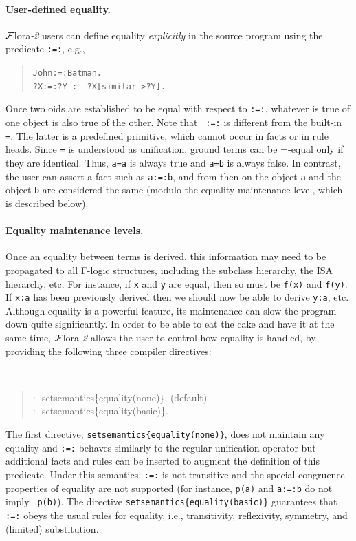 \documentclass[11pt]{article}
\newcommand{\FLORA}{{\mbox{\sc ${\cal F}${lora}\rm\emph{-2}}}\xspace}
\newcommand{\fl}{\mbox{F-logic}\xspace}
\begin{document}
\paragraph{User-defined equality.}
\FLORA users can define equality \emph{explicitly} in the source
program using the predicate {\tt :=:}, e.g.,
\begin{quote}
{\tt John:=:Batman.} \\
{\tt ?X:=:?Y :- ?X[similar->?Y].} \\
\end{quote}
Once two oids are established to be equal with respect to {\tt :=:},
whatever is true of one object is also true of the other. Note that {\tt
  :=:} is different from the built-in {\tt =}. The latter is a predefined
primitive, which cannot occur in facts or in rule heads.  
Since {\tt =} is understood as unification, ground terms can be 
  =-equal only if they are identical. Thus, {\tt a=a} is always true and
{\tt a=b} is always false. In contrast, the user can assert a fact such as
{\tt a:=:b}, and from then on the object {\tt a} and the object {\tt b} are
considered the same (modulo the equality maintenance level, which is
described below).       

\paragraph{Equality maintenance levels.}
Once an equality between terms is derived, this information may need to be
propagated to all \fl 
structures, including the subclass hierarchy, the ISA hierarchy, etc.
For instance, if {\tt x} and {\tt y} are equal, then so must be {\tt f(x)}
and {\tt f(y)}. If {\tt x:a} has been previously derived then we should now
be able to derive {\tt y:a}, etc. Although equality is a powerful
feature, its maintenance can slow the program down quite significantly.
In order to be able to eat the cake and have it at the same time, \FLORA
allows the user to control how equality is handled,
by providing the following three compiler directives:
{\tt
\begin{quote}
:- setsemantics\{equality(none)\}.  (default)\\
:- setsemantics\{equality(basic)\}.
\end{quote}
}

\noindent
The first directive, \mbox{\tt setsemantics\{equality(none)\}}, does not
maintain any equality and {\tt :=:} behaves similarly to the regular
unification operator but
additional facts and rules can be inserted to augment the definition of
this predicate. Under this semantics, {\tt :=:} is not
transitive and the special congruence properties of equality are not
supported (for instance, {\tt p(a)} and {\tt a:=:b} do not imply {\tt
  p(b)}). The directive
\mbox{\tt setsemantics\{equality(basic)\}} guarantees that {\tt :=:} obeys the
usual rules for equality, i.e., transitivity, reflexivity,
symmetry, and (limited) substitution.
\end{document}
